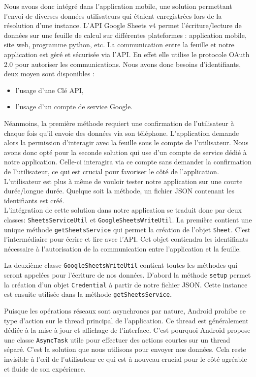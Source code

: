 \documentclass[../main.tex]{subfiles}
\begin{document}
Nous avons donc intégré dans l'application mobile, une solution permettant l'envoi de diverses données utilisateurs qui étaient enregistrées lors de la résolution d'une instance. L’API Google Sheets v4 permet l’écriture/lecture de données sur une feuille de calcul sur différentes plateformes : application mobile, site web, programme python, etc. La communication entre la feuille et notre application est géré et sécurisée via l’API. En effet elle utilise le protocole OAuth 2.0 pour autoriser les communications. Nous avons donc besoins d'identifiants, deux moyen sont disponibles :
\begin{itemize}
\item l’usage d’une Clé API,
\item l’usage d’un compte de service Google.
\end{itemize}

Néanmoins, la première méthode requiert une confirmation de l'utilisateur à chaque fois qu'il envoie des données via son téléphone. L'application demande alors la permission d'interagir avec la feuille sous le compte de l'utilisateur. Nous avons donc opté pour la seconde solution qui use d'un compte de service dédié à notre application. Celle-ci interagira via ce compte sans demander la confirmation de l'utilisateur, ce qui est crucial pour favoriser le côté  de l'application. L'utilisateur est plus à même de vouloir tester notre application sur une courte durée/longue durée. Quelque soit la méthode, un fichier JSON contenant les identifiants est créé.\\

L'intégration de cette solution dans notre application se traduit donc par deux classes: \texttt{SheetsServiceUtil} et \texttt{GoogleSheetsWriteUtil}. La première contient une unique méthode \texttt{getSheetsService} qui permet la création de l’objet \texttt{Sheet}. C'est l'intermédiaire pour écrire et lire avec l'API. Cet objet contiendra les identifiants nécessaire à l'autorisation de la communication entre l'application et la feuille.

La deuxième classe \texttt{GoogleSheetsWriteUtil} contient toutes les méthodes qui seront appelées pour l'écriture de nos données. D'abord la méthode \texttt{setup} permet la création d'un objet \texttt{Credential} à partir de notre fichier JSON. Cette instance est ensuite utilisée dans la méthode \texttt{getSheetsService}.

Puisque les opérations réseaux sont asynchrones par nature, Android prohibe ce type d'action sur le thread principal de l'application. Ce thread est généralement dédiée à la mise à jour et affichage de l'interface. C'est pourquoi Android propose une classe \texttt{AsyncTask} utile pour effectuer des actions courtes sur un thread séparé. C'est la solution que nous utilisons pour envoyer nos données. Cela reste invisible à l'œil de l'utilisateur ce qui est à nouveau crucial pour le côté agréable et fluide de son expérience.
\end{document}
